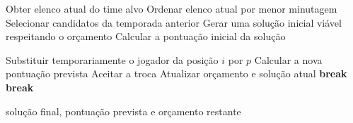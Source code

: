 \begin{algorithm}
\caption{Busca local com estratégia First Improvement}
\begin{algorithmic}

\State Obter elenco atual do time alvo
\State Ordenar elenco atual por menor minutagem
\State Selecionar candidatos da temporada anterior
\State Gerar uma solução inicial viável respeitando o orçamento
\State Calcular a pontuação inicial da solução

                \State Substituir temporariamente o jogador da posição $i$ por $p$
                \State Calcular a nova pontuação prevista
                    \State Aceitar a troca
                    \State Atualizar orçamento e solução atual
                    \State \textbf{break} 
                \EndIf
            \EndIf
        \EndFor
            \State \textbf{break}
        \EndIf
    \EndFor
\EndWhile

\State \Return solução final, pontuação prevista e orçamento restante

\end{algorithmic}
\end{algorithm}